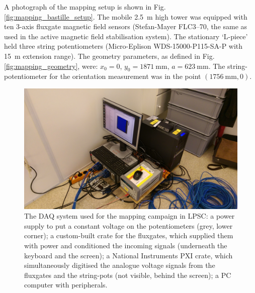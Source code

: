 A photograph of the mapping setup is shown in Fig.\,\ref{fig:mapping_bastille_setup}. The mobile \SI{2.5}{\metre} high tower was equipped with ten 3-axis fluxgate magnetic field sensors (Stefan-Mayer FLC3--70, the same as used in the active magnetic field stabilisation system).
The stationary `L-piece' held three string potentiometers (Micro-Eplison WDS-15000-P115-SA-P with \SI{15}{\metre} extension range).
The geometry parameters, as defined in Fig.\,\ref{fig:mapping_geometry}, were: $x_0 = 0$, $y_0 = \SI{1871}{\milli\metre}$, $a = \SI{623}{\milli\metre}$. The string-potentiometer for the orientation measurement was in the point $(\SI{1756}{\milli\metre}, 0)$.



\begin{figure}
  \centering
  \includegraphics[width=\linewidth]{gfx/mapping/lpsc/daq.jpeg}
  \caption{The DAQ system used for the mapping campaign in LPSC\@: a power supply to put a constant voltage on the potentiometers (grey, lower corner); a custom-built crate for the fluxgates, which supplied them with power and conditioned the incoming signals (underneath the keyboard and the screen); a National Instruments PXI crate, which simultaneously digitised the analogue voltage signals from the fluxgates and the string-pots (not visible, behind the screen); a PC computer with peripherals.}\label{fig:mapping_bastille_daq}
\end{figure}

